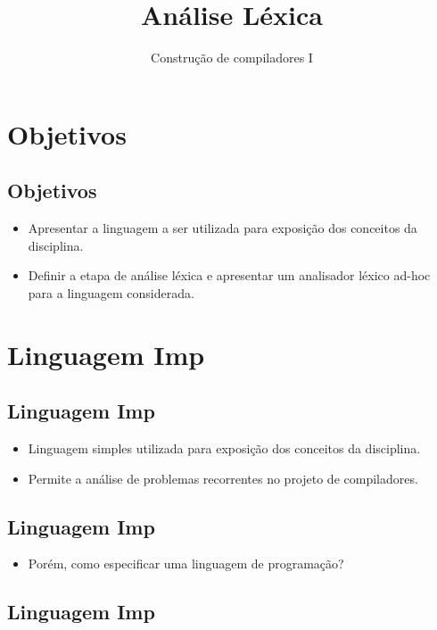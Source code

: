 \documentclass[11pt]{article}
\author{Construção de compiladores I}
\date{}
\title{Análise Léxica}
\begin{document}
\maketitle
\section*{Objetivos}
\label{sec:org55d0f00}

\subsection*{Objetivos}
\label{sec:org4f8bc50}

\begin{itemize}
\item Apresentar a linguagem a ser utilizada para exposição
dos conceitos da disciplina.

\item Definir a etapa de análise léxica e apresentar um analisador
léxico ad-hoc para a linguagem considerada.
\end{itemize}
\section*{Linguagem Imp}
\label{sec:org8da295b}

\subsection*{Linguagem Imp}
\label{sec:org9d5cf5c}

\begin{itemize}
\item Linguagem simples utilizada para exposição dos conceitos da disciplina.

\item Permite a análise de problemas recorrentes no projeto de compiladores.
\end{itemize}
\subsection*{Linguagem Imp}
\label{sec:org32e3cbc}

\begin{itemize}
\item Porém, como especificar uma linguagem de programação?
\end{itemize}
\subsection*{Linguagem Imp}
\label{sec:org8884673}
\end{document}
